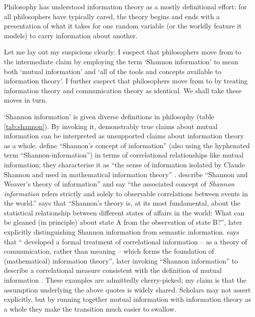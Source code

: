 \documentclass[12pt]{article}
\begin{document}
\begin{myquote}
Philosophy has understood information theory as a mostly definitional effort: for all philosophers have typically cared, the theory begins and ends with a presentation of what it takes for one random variable (or the worldly feature it models) to carry information about another.
\par\hspace*{\fill}\citet[1216]{martinez2019representations}
\end{myquote}

\noindent Let me lay out my suspicions clearly: I suspect that philosophers move from \ami{} to the intermediate claim \ait{} by employing the term `Shannon information' to mean both `mutual information' and `all of the tools and concepts available to information theory'.
I further suspect that philosophers move from \ait{} to \act{} by treating information theory and communication theory as identical.
We shall take these moves in turn.

`Shannon information' is given diverse definitions in philosophy (table \ref{tab:shannon}).
By invoking it, demonstrably true claims about mutual information can be interpreted as unsupported claims about information theory as a whole.
\citet[$\S$2]{godfrey-smith2016biological} define ``Shannon's concept of information'' (also using the hyphenated term ``Shannon-information'') in terms of correlational relationships like mutual information; they characterise it as ``the sense of information isolated by Claude Shannon and used in mathematical information theory'' \citep[1]{godfrey-smith2016biological}.
\citet[759]{owren2010redefining} describe ``Shannon and Weaver's \parencite*{shannon1949mathematical} theory of information'' and say ``the associated concept of \textit{Shannon information} refers strictly and solely to observable correlations between events in the world.''
\citet[106]{dennett2017bacteria} says that ``Shannon's theory is, at its most fundamental, about the statistical relationship between different states of affairs in the world: What can be gleaned (in principle) about state A from the observation of state B?'', later explicitly distinguishing Shannon information from semantic information.
\citet[p. 12, n. 11]{shea2018representation} says that ``\citet{shannon1948mathematicalc} developed a formal treatment of correlational information -- as a theory of communication, rather than meaning -- which forms the foundation of (mathematical) information theory'', later invoking ``Shannon information'' to describe a correlational measure consistent with the definition of mutual information \citep[p. 78, n. 5]{shea2018representation}.
These examples are admittedly cherry-picked; my claim is that the assumption underlying the above quotes is widely shared.
Scholars may not assert \ait{} explicitly, but by running together mutual information with information theory as a whole they make the transition much easier to swallow.
\end{document}
